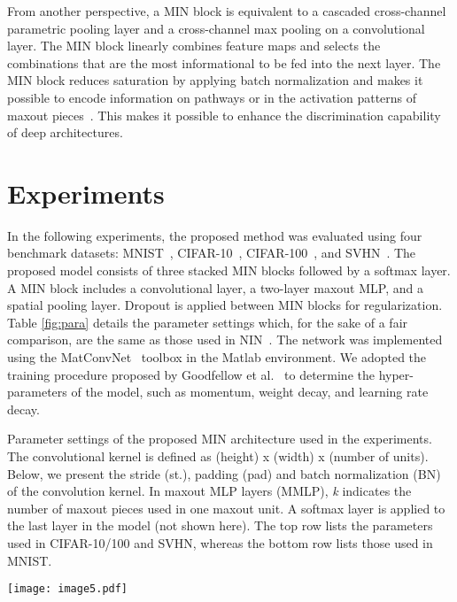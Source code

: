 \documentclass[10pt,twocolumn,letterpaper]{article}
\begin{document}
	From another perspective, a MIN block is equivalent to a cascaded cross-channel parametric pooling layer and a cross-channel max pooling on a convolutional layer. The MIN block linearly combines feature maps and selects the combinations that are the most informational to be fed into the next layer. The MIN block reduces saturation by applying batch normalization and makes it possible to encode information on pathways or in the activation patterns of maxout pieces~\cite{wang2014maxout}. This makes it possible to enhance the discrimination capability of deep architectures.



\section{Experiments}
In the following experiments, the proposed method was evaluated using four benchmark datasets: MNIST~\cite{lecun1998gradient}, CIFAR-10~\cite{krizhevsky2009learning}, CIFAR-100~\cite{krizhevsky2009learning}, and SVHN~\cite{netzer2011reading}.
The proposed model consists of three stacked MIN blocks followed by a softmax layer.
A MIN block includes a convolutional layer, a two-layer maxout MLP, and a spatial pooling layer. Dropout is applied between MIN blocks for regularization.
Table \ref{fig:para} details the parameter settings which, for the sake of a fair comparison, are the same as those used in NIN~\cite{DBLP:journals/corr/LinCY13}.
The network was implemented using the MatConvNet~\cite{vedaldi2014matconvnet} toolbox in the Matlab environment. We adopted the training procedure proposed by Goodfellow et al.~\cite{goodfellow2013maxout} to determine the hyper-parameters of the model, such as momentum, weight decay, and learning rate decay. 

\begin{table}
   \caption{Parameter settings of the proposed MIN architecture used in the experiments. The convolutional kernel is defined as (height) x (width) x (number of units). Below, we present the stride (st.), padding (pad) and batch normalization (BN) of the convolution kernel. In maxout MLP layers (MMLP), \textit{k} indicates the number of maxout pieces used in one maxout unit. A softmax layer is applied to the last layer in the model (not shown here). The top row lists the parameters used in CIFAR-10/100 and SVHN, whereas the bottom row lists those used in MNIST.}
\begin{center}
	\texttt{[image: image5.pdf]}
\end{center}
\label{fig:para}
\end{table}
\end{document}
